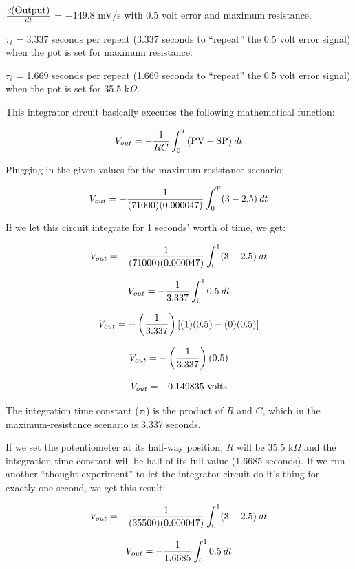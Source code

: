 
$d\hbox{(Output)} \over dt$ = $-149.8$ mV/s with 0.5 volt error and maximum resistance.

\vskip 10pt

$\tau_i$ = 3.337 seconds per repeat (3.337 seconds to ``repeat'' the 0.5 volt error signal) when the pot is set for maximum resistance.

\vskip 10pt

$\tau_i$ = 1.669 seconds per repeat (1.669 seconds to ``repeat'' the 0.5 volt error signal) when the pot is set for 35.5 k$\Omega$.







This integrator circuit basically executes the following mathematical function:

$$V_{out} = - {1 \over RC} \int_0^T (\hbox{PV} - \hbox{SP}) \> dt$$

Plugging in the given values for the maximum-resistance scenario:

$$V_{out} = - {1 \over (71000)(0.000047)} \int_0^T (3 - 2.5) \> dt$$

If we let this circuit integrate for 1 seconds' worth of time, we get:

$$V_{out} = - {1 \over (71000)(0.000047)} \int_0^1 (3 - 2.5) \> dt$$

$$V_{out} = - {1 \over 3.337} \int_0^1 0.5 \> dt$$

$$V_{out} = - \left({1 \over 3.337}\right) [(1)(0.5) - (0)(0.5)]$$

$$V_{out} = - \left({1 \over 3.337}\right) (0.5)$$

$$V_{out} = - 0.149835 \hbox{ volts}$$

The integration time constant ($\tau_i$) is the product of $R$ and $C$, which in the maximum-resistance scenario is 3.337 seconds.

\vskip 10pt

If we set the potentiometer at its half-way position, $R$ will be 35.5 k$\Omega$ and the integration time constant will be half of its full value (1.6685 seconds).  If we run another ``thought experiment'' to let the integrator circuit do it's thing for exactly one second, we get this result:

$$V_{out} = - {1 \over (35500)(0.000047)} \int_0^1 (3 - 2.5) \> dt$$

$$V_{out} = - {1 \over 1.6685} \int_0^1 0.5 \> dt$$


